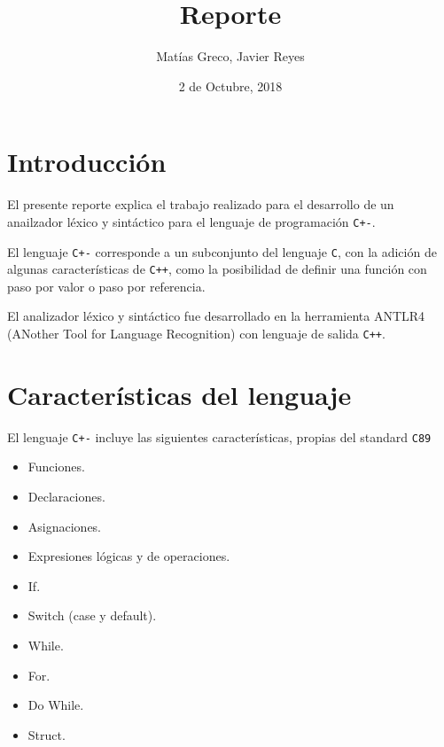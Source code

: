 \documentclass[12pt]{article}
\newcommand{\Cp}{\texttt{C+-}}
\newcommand{\C}{\texttt{C}}
\newcommand{\Cpp}{\texttt{C++}}
\begin{document}
    
    
    \title{Reporte}
    \author{Mat\'ias Greco, Javier Reyes}
    \date{2 de Octubre, 2018}
    \maketitle
    
    \section*{Introducci\'on}
    El presente reporte explica el trabajo realizado para el desarrollo de un anailzador l\'exico y sint\'actico para el lenguaje de programaci\'on \Cp.
    
    El lenguaje \texttt{C+-} corresponde a un subconjunto del lenguaje \C, con la adici\'on de algunas caracter\'isticas de \Cpp, como la posibilidad de definir una funci\'on con paso por valor o paso por referencia.
    
    El analizador l\'exico y sint\'actico fue desarrollado en la herramienta ANTLR4 (ANother Tool for Language Recognition) con lenguaje de salida \Cpp.
    
    
    \section*{Caracter\'isticas del lenguaje}
    
    El lenguaje \texttt{C+-} incluye las siguientes caracter\'isticas, propias del standard \texttt{C89}
    \begin{itemize}
        \item Funciones.
        \item Declaraciones.
        \item Asignaciones.
        \item Expresiones l\'ogicas y de operaciones.
        \item If.
        \item Switch (case y default).
        \item While.
        \item For.
        \item Do While.
        \item Struct.
    \end{itemize}
    
\end{document}
